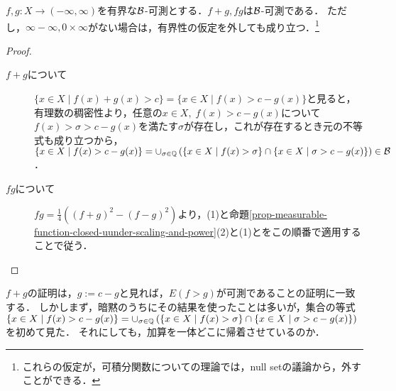 \documentclass[uplatex, dvipdfmx]{jsreport}
\begin{document}
\begin{proposition}[和と積]\label{prop-sum-and-product-of-measurable-functions}
    $f,g:X\to(-\infty,\infty)$を有界な$\mathcal{B}$-可測とする．$f+g,fg$は$\mathcal{B}$-可測である．
    ただし，$\infty-\infty,0\times\infty$がない場合は，有界性の仮定を外しても成り立つ．\footnote{これらの仮定が，可積分関数についての理論では，null setの議論から，外すことができる．}
\end{proposition}
\begin{proof}\mbox{}
    \begin{description}
        \item[$f+g$について] $\{x\in X\mid f(x)+g(x)>c\}=\{x\in X\mid f(x)>c-g(x)\}$と見ると，有理数の稠密性より，任意の$x\in X,\;f(x)>c-g(x)$について$f(x)>\sigma>c-g(x)$を満たす$\sigma$が存在し，これが存在するとき元の不等式も成り立つから，$\{x\in X\mid f(x)>c-g(x)\}=\cup_{\sigma\in\mathbb{Q}}\left(\{x\in X\mid f(x)>\sigma\}\cap\{x\in X\mid\sigma>c-g(x)\}\right)\in\mathcal{B}$．
        \item[$fg$について] $fg=\frac{1}{4}((f+g)^2-(f-g)^2)$より，(1)と命題\ref{prop-measurable-function-closed-uunder-scaling-and-power}(2)と(1)とをこの順番で適用することで従う．
    \end{description}
\end{proof}
\begin{remarks}[可測関数で挟んだ領域の逆像も可算]
    $f+g$の証明は，$g:=c-g$と見れば，$E(f>g)$が可測であることの証明に一致する．
    しかしまず，暗黙のうちにその結果を使ったことは多いが，集合の等式$\{x\in X\mid f(x)>c-g(x)\}=\cup_{\sigma\in\mathbb{Q}}\left(\{x\in X\mid f(x)>\sigma\}\cap\{x\in X\mid\sigma>c-g(x)\}\right)$を初めて見た．
    それにしても，加算を一体どこに帰着させているのか．
\end{remarks}
\end{document}
